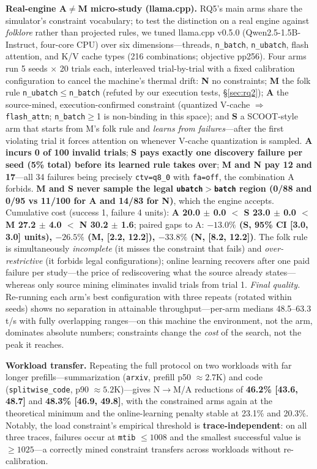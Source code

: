 \documentclass[journal]{IEEEtran}
\newcommand{\code}[1]{\texttt{#1}}
\begin{document}
\textbf{Real-engine A$\neq$M micro-study (llama.cpp).} RQ5's main arms share the simulator's constraint vocabulary; to test the distinction on a real engine against \emph{folklore} rather than projected rules, we tuned llama.cpp v0.5.0 (Qwen2.5-1.5B-Instruct, four-core CPU) over six dimensions---threads, \code{n\_batch}, \code{n\_ubatch}, flash attention, and K/V cache types (216 combinations; objective pp256). Four arms run 5 seeds $\times$ 20 trials each, interleaved trial-by-trial with a fixed calibration configuration to cancel the machine's thermal drift: \textbf{N} no constraints; \textbf{M} the folk rule \code{n\_ubatch}$\leq$\code{n\_batch} (refuted by our execution tests, \S\ref{sec:rq2}); \textbf{A} the source-mined, execution-confirmed constraint (quantized V-cache $\Rightarrow$ \code{flash\_attn}; \code{n\_batch}$\geq$1 is non-binding in this space); and \textbf{S} a SCOOT-style arm that starts from M's folk rule and \emph{learns from failures}---after the first violating trial it forces attention on whenever V-cache quantization is sampled. \textbf{A incurs 0 of 100 invalid trials}; \textbf{S pays exactly one discovery failure per seed (5\% total) before its learned rule takes over}; \textbf{M and N pay 12 and 17}---all 34 failures being precisely \code{ctv=q8\_0} with \code{fa=off}, the combination A forbids. \textbf{M and S never sample the legal \code{ubatch}$>$\code{batch} region (0/88 and 0/95 vs 11/100 for A and 14/83 for N)}, which the engine accepts. Cumulative cost (success 1, failure 4 units): \textbf{A 20.0 $\pm$ 0.0 $<$ S 23.0 $\pm$ 0.0 $<$ M 27.2 $\pm$ 4.0 $<$ N 30.2 $\pm$ 1.6}; paired gaps to A: \textbf{$-13.0\%$ (S, 95\% CI [3.0, 3.0] units), $-26.5\%$ (M, [2.2, 12.2]), $-33.8\%$ (N, [8.2, 12.2])}. The folk rule is simultaneously \emph{incomplete} (it misses the constraint that fails) and \emph{over-restrictive} (it forbids legal configurations); online learning recovers after one paid failure per study---the price of rediscovering what the source already states---whereas only source mining eliminates invalid trials from trial 1. \emph{Final quality.} Re-running each arm's best configuration with three repeats (rotated within seeds) shows no separation in attainable throughput---per-arm medians 48.5--63.3\,t/s with fully overlapping ranges---on this machine the environment, not the arm, dominates absolute numbers; constraints change the \emph{cost} of the search, not the peak it reaches.

\textbf{Workload transfer.} Repeating the full protocol on two workloads with far longer prefills---summarization (\code{arxiv}, prefill p50 ${\approx}2.7$K) and code (\code{splitwise\_code}, p90 ${\approx}5.2$K)---gives N$\rightarrow$M/A reductions of \textbf{46.2\% [43.6, 48.7]} and \textbf{48.3\% [46.9, 49.8]}, with the constrained arms again at the theoretical minimum and the online-learning penalty stable at 23.1\% and 20.3\%. Notably, the load constraint's empirical threshold is \textbf{trace-independent}: on all three traces, failures occur at \code{mtib} $\leq 1008$ and the smallest successful value is $\geq 1025$---a correctly mined constraint transfers across workloads without re-calibration.
\end{document}
